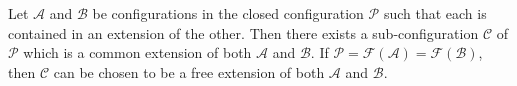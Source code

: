 Let $\mathcal{A}$ and $\mathcal{B}$ be configurations in the closed configuration $\mathcal{P}$ such that each is contained in an extension of the other. Then there exists a sub-configuration $\mathcal{C}$ of $\mathcal{P}$ which is a common extension of both $\mathcal{A}$ and $\mathcal{B}$. If $\mathcal{P} = \mathcal{F}(\mathcal{A}) = \mathcal{F}(\mathcal{B})$, then $\mathcal{C}$ can be chosen to be a free extension of both $\mathcal{A}$ and $\mathcal{B}$.
